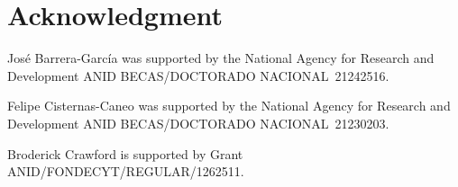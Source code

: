 \documentclass[conference]{IEEEtran}
\begin{document}
\section*{Acknowledgment}
José Barrera-García was supported by the National Agency for Research and Development ANID BECAS/DOCTORADO NACIONAL 21242516.

Felipe Cisternas-Caneo was supported by the National Agency for Research and Development ANID BECAS/DOCTORADO NACIONAL 21230203.

Broderick Crawford is supported by Grant ANID/FONDECYT/REGULAR/1262511.



\end{document}
